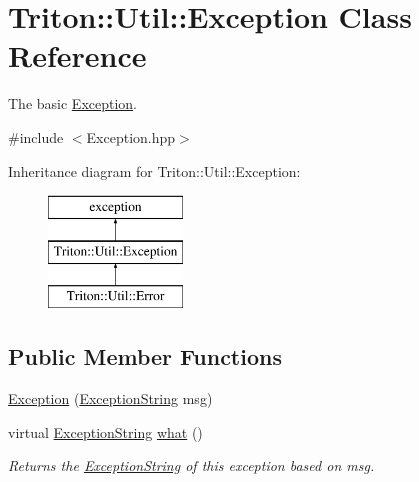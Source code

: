 \hypertarget{class_triton_1_1_util_1_1_exception}{}\section{Triton\+:\+:Util\+:\+:Exception Class Reference}
\label{class_triton_1_1_util_1_1_exception}


The basic \hyperlink{class_triton_1_1_util_1_1_exception}{Exception}.  




{\ttfamily \#include $<$Exception.\+hpp$>$}

Inheritance diagram for Triton\+:\+:Util\+:\+:Exception\+:\begin{figure}[H]
\begin{center}
\leavevmode
\includegraphics[height=3.000000cm]{class_triton_1_1_util_1_1_exception}
\end{center}
\end{figure}
\subsection*{Public Member Functions}
\begin{DoxyCompactItemize}
\item 
\hyperlink{class_triton_1_1_util_1_1_exception_a04987c7d05ff78f037f80b4273260ef4}{Exception} (\hyperlink{namespace_triton_1_1_util_a7e55ae91d6ccf98a52870cf7b7648eb7}{Exception\+String} msg)
\item 
virtual \hyperlink{namespace_triton_1_1_util_a7e55ae91d6ccf98a52870cf7b7648eb7}{Exception\+String} \hyperlink{class_triton_1_1_util_1_1_exception_a0465e58a2b774c528f6080f4c39ee162}{what} ()
\begin{DoxyCompactList}\small\item\em Returns the \hyperlink{namespace_triton_1_1_util_a7e55ae91d6ccf98a52870cf7b7648eb7}{Exception\+String} of this exception based on msg. \end{DoxyCompactList}\end{DoxyCompactItemize}
